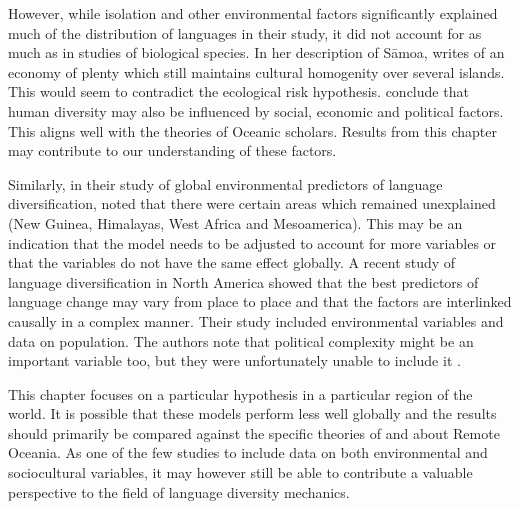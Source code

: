 \documentclass[a4paper,10pt]{article} %
\begin{document}
However, while isolation and other environmental factors significantly explained much of the distribution of languages in their study, it did not account for as much as in studies of biological species. In her description of S\={a}moa, \citet[287]{mead1937samoans} writes of an economy of plenty which still maintains cultural homogenity over several islands. This would seem to contradict the ecological risk hypothesis. \citet{gavin2012island} conclude that human diversity may also be influenced by social, economic and political factors. This aligns well with the theories of Oceanic scholars. Results from this chapter may contribute to our understanding of these factors.



Similarly, in their study of global environmental predictors of language diversification, \citet{hua2019ecological} noted that there were certain areas which remained unexplained (New Guinea, Himalayas, West Africa and Mesoamerica). This may be an indication that the model needs to be adjusted to account for more variables or that the variables do not have the same effect globally. A recent study of language diversification in North America \citep{Pacheco_Coelho_2019} showed that the best predictors of language change may vary from place to place and that the factors are interlinked causally in a complex manner. Their study included environmental variables and data on population. The authors note that political complexity might be an important variable too, but they were unfortunately unable to include it \citep[7]{Pacheco_Coelho_2019}.

This chapter focuses on a particular hypothesis in a particular region of the world. It is possible that these models perform less well globally and the results should primarily be compared against the specific theories of \citet{lynch1981melanesian} and \citet{pawley81, pawley2007} about Remote Oceania. As one of the few studies to include data on both environmental and sociocultural variables, it may however still be able to contribute a valuable perspective to the field of language diversity mechanics.
\end{document}

